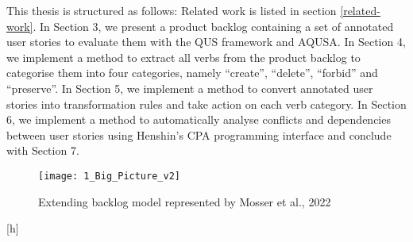 This thesis is structured as follows: Related work is listed in section \ref{related-work}. In Section 3, we present a product backlog containing a set of annotated user stories to evaluate them with the QUS framework and AQUSA. In Section 4, we implement a method to extract all verbs from the product backlog to categorise them into four categories, namely \enquote{create}, \enquote{delete}, \enquote{forbid} and \enquote{preserve}. In Section 5, we implement a method to convert annotated user stories into transformation rules and take action on each verb category. In Section 6, we implement a method to automatically analyse conflicts and dependencies between user stories using Henshin's CPA programming interface and conclude with Section 7.
\begin{figure}[h]
\texttt{[image: 1\_Big\_Picture\_v2]}
\caption{Extending backlog model represented by Mosser et al., 2022\cite{mosser2022modelling}}\label{fig:workflow_diagram}
\end{figure}[h]
